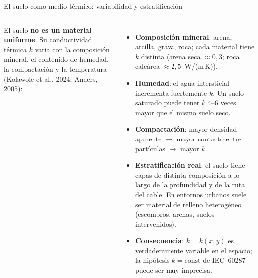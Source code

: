 \documentclass[aspectratio=169]{beamer}
\newcommand{\refcite}[1]{{\footnotesize\color{gray!70!black} #1}}
\begin{document}
\begin{frame}{El suelo como medio térmico: variabilidad y estratificación}
\begin{columns}[T]
\justifying\small
El suelo \textbf{no es un material uniforme}. Su conductividad térmica $k$
varia con la composición mineral, el contenido de humedad, la compactación
y la temperatura \refcite{(Kolawole et al., 2024; Anders, 2005)}:
\begin{itemize}[leftmargin=*]\scriptsize
    \item \textbf{Composición mineral}: arena, arcilla, grava, roca; cada
          material tiene $k$ distinta (arena seca $\approx0{,}3$; roca
          calcárea $\approx2{,}5$~W/(m\,K)).
    \item \textbf{Humedad}: el agua intersticial incrementa fuertemente $k$.
          Un suelo saturado puede tener $k$ 4--6 veces mayor que el mismo
          suelo seco.
    \item \textbf{Compactación}: mayor densidad aparente $\to$ mayor contacto
          entre partículas $\to$ mayor $k$.
    \item \textbf{Estratificación real}: el suelo tiene capas de distinta
          composición a lo largo de la profundidad y de la ruta del cable.
          En entornos urbanos suele ser material de relleno heterogéneo
          (escombros, arenas, suelos intervenidos).
    \item \textbf{Consecuencia}: $k=k(x,y)$ es verdaderamente variable en
          el espacio; la hipótesis $k=\text{const}$ de IEC~60287 puede ser
          muy imprecisa.
\end{itemize}


\end{columns}
\end{frame}
\end{document}
